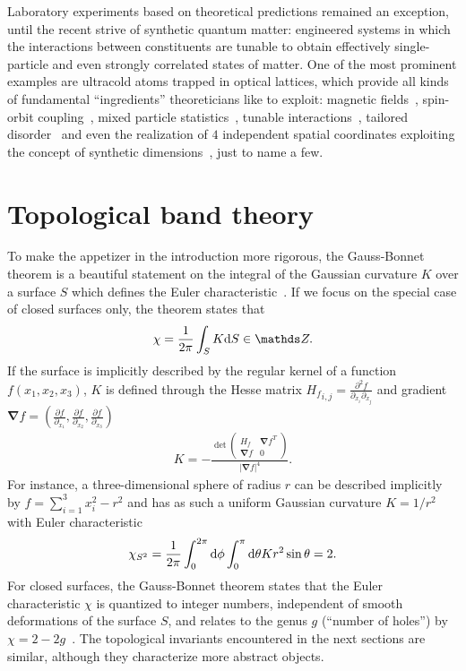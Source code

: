 Laboratory experiments based on theoretical predictions remained an exception, until the recent strive of synthetic quantum matter:
engineered systems in which the interactions between constituents are tunable to obtain effectively single-particle and even strongly correlated states of matter.
One of the most prominent examples are ultracold atoms trapped in optical lattices, which provide all kinds of fundamental ``ingredients'' theoreticians like to exploit: magnetic fields~\cite{Lin2009}, spin-orbit coupling~\cite{Lin2011}, mixed particle statistics~\cite{Ferrari2002}, tunable interactions~\cite{Chin2010}, tailored disorder~\cite{Meier2018} and even the realization of $4$ independent spatial coordinates exploiting the concept of synthetic dimensions~\cite{Lohse2018}, just to name a few.
%
%
\section{Topological band theory}
\label{sec:topological_band_theory}
%
%
To make the appetizer in the introduction more rigorous, the Gauss-Bonnet theorem is a beautiful statement on the integral of the Gaussian curvature $K$ over a surface $S$ which defines the Euler characteristic~\cite{Nakahara1990}.
If we focus on the special case of closed surfaces only, the theorem states that
\begin{align}
    \chi = \frac1{2\pi}\int_S K\rd S\in\mathds Z.
    \label{eq:gauss_bonnet_theorem}
\end{align}
If the surface is implicitly described by the regular kernel of a function $f(x_1,x_2,x_3)$, $K$ is defined through the Hesse matrix ${H_f}_{i,j}=\frac{\partial^2 f}{\partial_{x_i}\partial_{x_j}}$ and gradient $\bm\nabla f = (\frac{\partial f}{\partial_{x_1}},\frac{\partial f}{\partial_{x_2}},\frac{\partial f}{\partial_{x_3}})$~\cite{Goldman2005}
\begin{align}
    K = -\frac{
    \det
    \begin{pmatrix}
        H_f & \bm\nabla f^T \\
        \bm\nabla f & 0
    \end{pmatrix}
    }{|\bm\nabla f|^4}
    .
\end{align}
For instance, a three-dimensional sphere of radius $r$ can be described implicitly by $f=\sum_{i=1}^3 x_i^2 - r^2$ and has as such a uniform Gaussian curvature $K=1/r^2$ with Euler characteristic
\begin{align}
    \chi_{S^2} = \frac1{2\pi}\int_0^{2\pi}\mathrm d\phi \int_0^\pi\mathrm d\theta K r^2\sin\theta = 2.
\end{align}
For closed surfaces, the Gauss-Bonnet theorem states that the Euler characteristic $\chi$ is quantized to integer numbers, independent of smooth deformations of the surface $S$, and relates to the genus $g$ (``number of holes'') by $\chi=2-2g$~\cite{Nakahara1990}.
The topological invariants encountered in the next sections are similar, although they characterize more abstract objects.

